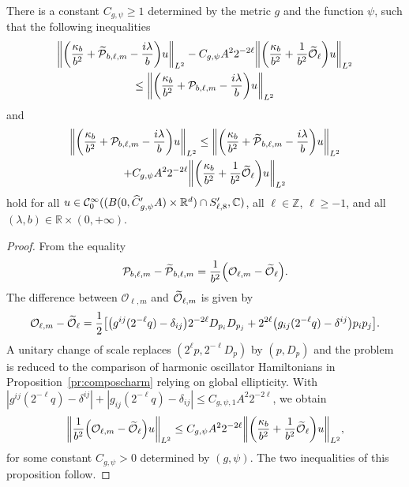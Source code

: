 \documentclass[AHL,Unicode,longabstracts]{cedram}
\newcommand{\C}{\mathbb{C}}
\newcommand{\Z}{\mathbb{Z}}
\newcommand{\R}{\mathbb{R}}
\newcommand{\clC}{\mathcal{C}}
\newcommand{\clO}{\mathcal{O}}
\newcommand{\clP}{\mathcal{P}}
\let\oldtilde\tilde
\renewcommand*{\tilde}[1]{\mathchoice{\widetilde{#1}}{\widetilde{#1}}{\oldtilde{#1}}{\oldtilde{#1}}}
\let\oldhat\hat
\renewcommand*{\hat}[1]{\mathchoice{\widehat{#1}}{\widehat{#1}}{\oldhat{#1}}{\oldhat{#1}}}
\let\originalleft\left
\let\originalright\right
\renewcommand{\left}{\mathopen{}\mathclose\bgroup\originalleft}
\renewcommand{\right}{\aftergroup\egroup\originalright}
\begin{document}
\begin{prop}\label{pr:ChangingOToTheEuclideanO}
There is a constant $C_{g,\psi}\geq 1$ determined by the metric $g$ and the function $\psi$, such that the following inequalities
\begin{multline*}
\left\| \left(
\frac{\kappa_{b}}{b^{2}} + \tilde{\clP}_{b,\ell,m} - \frac{i\lambda}{b}
\right) u \right\|_{L^2} - C_{g,\psi} A^{2}2^{-2\ell}\left\|\left(
\frac{\kappa_{b}}{b^{2}} + \frac{1}{b^{2}}\tilde{\clO}_{\ell}
\right) u \right\|_{L^2}
\\
\leq
\left\| \left(
\frac{\kappa_{b}}{b^{2}} + \clP_{b,\ell,m}-\frac{i\lambda}{b}
\right) u\right\|_{L^2}
\end{multline*}
and
\begin{multline*}
\left\|\left(
\frac{\kappa_{b}}{b^{2}} + \clP_{b,\ell,m}-\frac{i\lambda}{b}
\right) u\right\|_{L^2}
\leq
\left\|\left(
\frac{\kappa_{b}}{b^{2}} + \tilde{\clP}_{b,\ell,m} - \frac{i\lambda}{b}
\right) u \right\|_{L^2}
\\
+ C_{g,\psi} A^{2}2^{-2\ell}
\left\|\left(
\frac{\kappa_{b}}{b^{2}} + \frac{1}{b^{2}}\tilde{\clO}_{\ell}
\right) u \right\|_{L^2}
\end{multline*}
hold for all $u\in \clC^\infty_0((B(0,\hat{C}'_{g,\psi}A)\times \R^d)\cap S_{\ell,8}',\C)$, all $\ell\in\Z$, $\ell\geq -1$, and all $(\lambda,b)\in \R\times (0,+\infty)$.
\end{prop}

\begin{proof}
From the equality
\begin{equation}
\clP_{b,\ell,m} - \tilde{\clP}_{b,\ell,m} = \frac{1}{b^{2}}
\left(
\clO_{\ell,m} - \tilde{\clO}_{\ell}
\right).
\end{equation}
The difference between $\clO_{\ell,m}$ and $\tilde{\clO}_{\ell,m}$ is given by
\begin{equation}
\clO_{\ell,m}- \tilde{\clO}_{\ell} = \frac{1}{2}
\left[
\left(g^{ij}(2^{-\ell}q)-\delta_{ij}
\right)2^{-2\ell}D_{p_{i}}D_{p_{j}} +2^{2\ell}
\left(g_{ij}(2^{-\ell}q)-\delta^{ij} \right)p_{i}p_{j}
\right].
\end{equation}
A unitary change of scale replaces $(2^\ell p, 2^{-\ell} D_p)$ by $(p,D_p)$ and the problem is reduced to the comparison of harmonic oscillator Hamiltonians in Proposition~\ref{pr:composcharm} relying on global ellipticity. With $|g^{ij}(2^{-\ell}q)-\delta^{ij}|+|g_{ij}(2^{-\ell}q)-\delta_{ij}|\leq C_{g,\psi,1}A^2 2^{-2\ell}$, we obtain
\begin{equation}\label{eq:upperBoundForReplacingOToTheEuclideanO}
\left\| \frac{1}{b^{2}}
\left(
\clO_{\ell,m} - \tilde{\clO}_{\ell}
\right) u \right\|_{L^2} \leq C_{g,\psi} A^{2}2^{-2\ell} \left\|
\left(
\frac{\kappa_{b}}{b^{2}} + \frac{1}{b^{2}}\tilde{\clO}_{\ell}
\right) u \right\|_{L^2},
\end{equation}
for some constant $C_{g,\psi}>0$ determined by $(g,\psi)$. The two inequalities of this proposition follow.
\end{proof}
\end{document}
